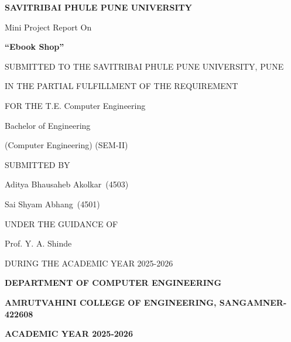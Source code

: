 \documentclass[12pt,a4paper]{report}
\newcommand{\UniversityName}{SAVITRIBAI PHULE PUNE UNIVERSITY}
\newcommand{\DepartmentName}{DEPARTMENT OF COMPUTER ENGINEERING}
\newcommand{\ProjectTitle}{Ebook Shop}
\newcommand{\StudentOneName}{Aditya Bhausaheb Akolkar}
\newcommand{\StudentOneRoll}{4503}
\newcommand{\StudentTwoName}{Sai Shyam Abhang}
\newcommand{\StudentTwoRoll}{4501}
\newcommand{\GuideName}{Prof. Y. A. Shinde}
\newcommand{\AcademicYear}{2025-2026}
\newcommand{\ClassName}{T.E. Computer Engineering}
\newcommand{\DegreeName}{Bachelor of Engineering}
\newcommand{\SemesterName}{SEM-II}
\begin{document}

\begin{titlepage}
    \centering

    {\Large\bfseries \UniversityName \par}
    \vspace{1.2cm}

    {\Large Mini Project Report On \par}
    \vspace{0.7cm}

    {\Huge\bfseries ``\ProjectTitle'' \par}
    \vspace{1.0cm}

    {\large SUBMITTED TO THE SAVITRIBAI PHULE PUNE UNIVERSITY, PUNE \par}
    \vspace{0.25cm}
    {\large IN THE PARTIAL FULFILLMENT OF THE REQUIREMENT \par}
    {\large FOR THE \ClassName \par}
    {\large \DegreeName \par}
    {\large (Computer Engineering) (\SemesterName) \par}

    \vspace{1.1cm}
    {\large SUBMITTED BY \par}
    \vspace{0.3cm}
    {\large \StudentOneName\ (\StudentOneRoll) \par}
    {\large \StudentTwoName\ (\StudentTwoRoll) \par}

    \vspace{0.9cm}
    {\large UNDER THE GUIDANCE OF \par}
    \vspace{0.3cm}
    {\large \GuideName \par}

    \vspace{0.9cm}
    {\large DURING THE ACADEMIC YEAR \AcademicYear \par}

    \vfill

    {\large\bfseries \DepartmentName \par}
    {\large\bfseries AMRUTVAHINI COLLEGE OF ENGINEERING, SANGAMNER-422608 \par}
    {\large\bfseries ACADEMIC YEAR \AcademicYear \par}

\end{titlepage}
\end{document}
